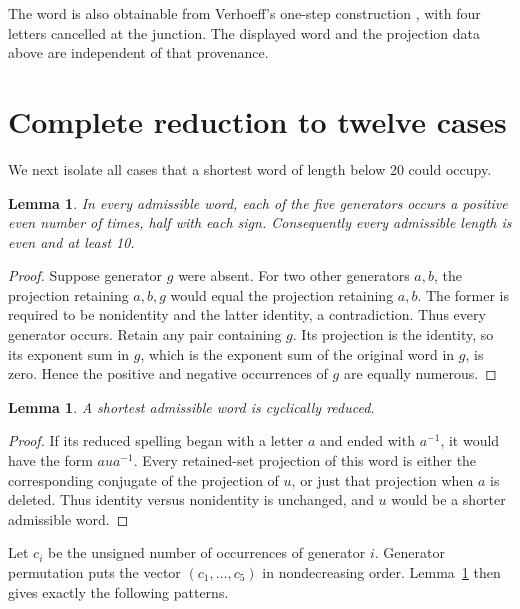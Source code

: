 \documentclass[11pt]{article}
\newtheorem{lemma}[theorem]{Lemma}
\begin{document}
The word is also obtainable from Verhoeff's one-step construction
\cite[Proposition~15]{Verhoeff2026}, with four letters cancelled at the
junction.  The displayed word and the projection data above are independent
of that provenance.

\section{Complete reduction to twelve cases}

We next isolate all cases that a shortest word of length below 20 could
occupy.

\begin{lemma}\label{lem:counts}
In every admissible word, each of the five generators occurs a positive even
number of times, half with each sign.  Consequently every admissible length is
even and at least 10.
\end{lemma}

\begin{proof}
Suppose generator \(g\) were absent.  For two other generators \(a,b\), the
projection retaining \(a,b,g\) would equal the projection retaining \(a,b\).
The former is required to be nonidentity and the latter identity, a
contradiction.  Thus every generator occurs.  Retain any pair containing
\(g\).  Its projection is the identity, so its exponent sum in \(g\), which
is the exponent sum of the original word in \(g\), is zero.  Hence the
positive and negative occurrences of \(g\) are equally numerous.
\end{proof}

\begin{lemma}\label{lem:cyclic}
A shortest admissible word is cyclically reduced.
\end{lemma}

\begin{proof}
If its reduced spelling began with a letter \(a\) and ended with \(a^{-1}\),
it would have the form \(aua^{-1}\).  Every retained-set projection of this
word is either the corresponding conjugate of the projection of \(u\), or
just that projection when \(a\) is deleted.  Thus identity versus nonidentity
is unchanged, and \(u\) would be a shorter admissible word.
\end{proof}

Let \(c_i\) be the unsigned number of occurrences of generator \(i\).
Generator permutation puts the vector \((c_1,\ldots,c_5)\) in nondecreasing
order.  Lemma~\ref{lem:counts} then gives exactly the following patterns.
\end{document}
